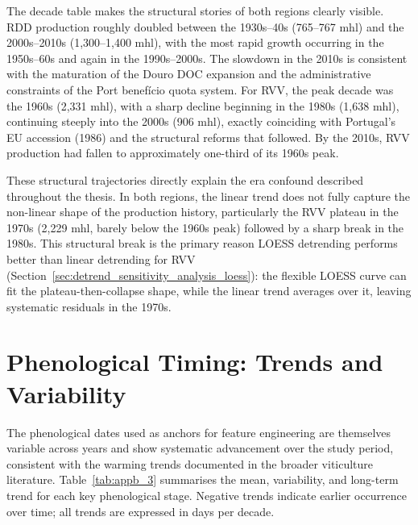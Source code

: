 The decade table makes the structural stories of both regions clearly visible. RDD production roughly doubled between the 1930s--40s (765--767 mhl) and the 2000s--2010s (1,300--1,400 mhl), with the most rapid growth occurring in the 1950s--60s and again in the 1990s--2000s. The slowdown in the 2010s is consistent with the maturation of the Douro DOC expansion and the administrative constraints of the Port benef\'icio quota system. For RVV, the peak decade was the 1960s (2,331 mhl), with a sharp decline beginning in the 1980s (1,638 mhl), continuing steeply into the 2000s (906 mhl), exactly coinciding with Portugal's EU accession (1986) and the structural reforms that followed. By the 2010s, RVV production had fallen to approximately one-third of its 1960s peak.

These structural trajectories directly explain the era confound described throughout the thesis. In both regions, the linear trend does not fully capture the non-linear shape of the production history, particularly the RVV plateau in the 1970s (2,229 mhl, barely below the 1960s peak) followed by a sharp break in the 1980s. This structural break is the primary reason LOESS detrending performs better than linear detrending for RVV (Section~\ref{sec:detrend_sensitivity_analysis_loess}): the flexible LOESS curve can fit the plateau-then-collapse shape, while the linear trend averages over it, leaving systematic residuals in the 1970s.


\section{Phenological Timing: Trends and Variability}\label{app_sec:phenological_timing_trends_and}

The phenological dates used as anchors for feature engineering are themselves variable across years and show systematic advancement over the study period, consistent with the warming trends documented in the broader viticulture literature. Table~\ref{tab:appb_3} summarises the mean, variability, and long-term trend for each key phenological stage. Negative trends indicate earlier occurrence over time; all trends are expressed in days per decade.

